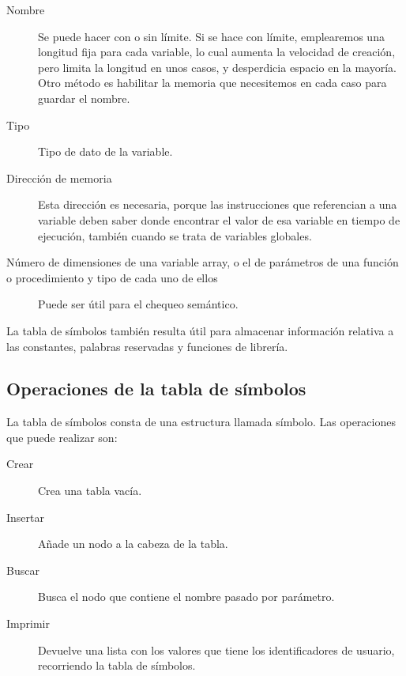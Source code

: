 \documentclass[11pt, english]{article}
\begin{document}
	\begin{description}
		
		\item[Nombre] Se puede hacer con o sin límite. Si se hace con límite, emplearemos una longitud fija para cada variable, lo cual aumenta la velocidad de creación, pero limita la longitud en unos casos, y desperdicia espacio en la mayoría. Otro método es habilitar la memoria que necesitemos en cada caso para guardar el nombre.\newline
		\item[Tipo] Tipo de dato de la variable.\newline
		\item[Dirección de memoria] Esta dirección es necesaria, porque las instrucciones que referencian a una variable deben saber donde encontrar el valor de esa variable en tiempo de ejecución, también cuando se trata de variables globales.\newline
		\item[Número de dimensiones de una variable array, o el de parámetros de una función o procedimiento y tipo de cada uno de ellos] Puede ser útil para el chequeo semántico.\newline
		
	\end{description}
	
	La tabla de símbolos también resulta útil para almacenar información relativa a las constantes, palabras reservadas y funciones de librería.

	\newpage
	
	\subsection{Operaciones de la tabla de símbolos}

	La tabla de símbolos consta de una estructura llamada símbolo. Las operaciones que puede realizar son:
	
	\begin{description}
		
		\item[Crear] Crea una tabla vacía.\newline
		\item[Insertar] Añade un nodo a la cabeza de la tabla.\newline
		\item[Buscar] Busca el nodo que contiene el nombre pasado por parámetro.\newline
		\item[Imprimir] Devuelve una lista con los valores que tiene los identificadores de usuario, recorriendo la tabla de símbolos.\newline
		
	\end{description}
\end{document}
